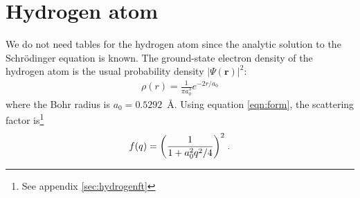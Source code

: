 \documentclass[11pt]{article}
\renewcommand{\vec}[1]{\boldsymbol{#1}}
\begin{document}
\section{Hydrogen atom}

We do not need tables for the hydrogen atom since the analytic solution to the Schr\"odinger 
equation is known.  The ground-state electron density of the hydrogen atom is the usual probability
density $|\Psi(\vec r)|^2$:
\begin{align}
 \rho(r) = \frac{1}{\pi a_0^3}e^{-2r/a_0}
\end{align}
where the Bohr radius is $a_0=0.5292$~\AA{}.  Using equation \ref{eqn:form}, the scattering factor is\footnote{See appendix \ref{sec:hydrogenft}}
\begin{align}
 f(q) = \qty( \frac{1}{1+a_0^2q^2/4} )^2 \;.
\end{align}


% 
% 
\end{document}
